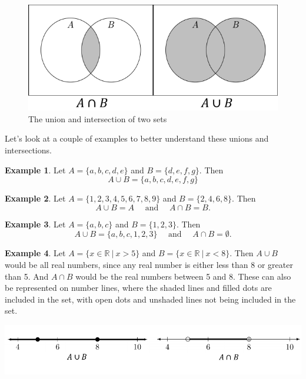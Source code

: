 \documentclass[
]{book}
\theoremstyle{definition}
\theoremstyle{definition}
\newtheorem{example}{Example}[chapter]
\theoremstyle{definition}
\theoremstyle{definition}
\theoremstyle{remark}
\begin{document}
\begin{figure}

{\centering \includegraphics[width=0.7\linewidth]{tikz/Set_unions_intersections} 

}

\caption{The union and intersection of two sets}\label{fig:set-union}
\end{figure}

Let's look at a couple of examples to better understand these unions and intersections.

\begin{example}
Let \(A = \{a, b, c, d, e\}\) and \(B = \{ d, e, f, g\}\). Then \[A\cup B=\{a, b, c, d, e, f, g\} \]
\end{example}

\begin{example}
Let \(A=\{1,2,3,4,5,6,7,8,9\}\) and \(B=\{2,4,6,8\}\). Then
\[A \cup B = A \quad \mbox{ and } \quad A\cap B = B.\]
\end{example}

\begin{example}
Let \(A=\{a,b,c\}\) and \(B=\{1,2,3\}\). Then
\[A\cup B = \{a,b,c,1,2,3\} \quad \mbox{ and } \quad A\cap B =\emptyset.\]
\end{example}

\begin{example}

Let \(A = \{ x\in \mathbb{R} \: \vert \: x > 5\}\) and \(B=\{x \in \mathbb{R} \: \vert \: x < 8\}\). Then \(A\cup B\) would be all real numbers, since any real number is either less than 8 or greater than 5. And \(A\cap B\) would be the real numbers between 5 and 8. These can also be represented on number lines, where the shaded lines and filled dots are included in the set, with open dots and unshaded lines not being included in the set.

\begin{center}\includegraphics[width=0.95\linewidth]{tikz/number-line-unions} \end{center}

\end{example}
\end{document}

